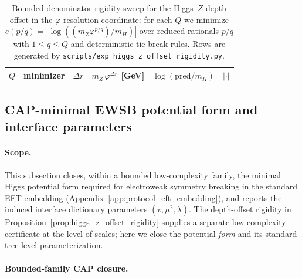 \begin{table}[t]
\centering
\scriptsize
\setlength{\tabcolsep}{6pt}
\renewcommand{\arraystretch}{1.15}
\begin{tabular}{r l r r r r}
\toprule
$Q$ & minimizer & $\Delta r$ & $m_Z\,\varphi^{\Delta r}$ [GeV] & $\log(\mathrm{pred}/m_H)$ & $|\cdot|$ \\
\midrule
%
\end{tabular}
\caption{Bounded-denominator rigidity sweep for the Higgs--$Z$ depth offset in the $\varphi$-resolution coordinate: for each $Q$ we minimize $e(p/q)=|\log((m_Z\varphi^{p/q})/m_H)|$ over reduced rationals $p/q$ with $1\le q\le Q$ and deterministic tie-break rules. Rows are generated by \texttt{scripts/exp\_higgs\_z\_offset\_rigidity.py}.}
\label{tab:higgs_z_offset_sweep}
\end{table}

\subsection{CAP-minimal EWSB potential form and interface parameters}

\paragraph{Scope.}
\AuditTag This subsection closes, within a bounded low-complexity family, the minimal Higgs potential form required for electroweak symmetry breaking in the standard EFT embedding (Appendix~\ref{app:protocol_eft_embedding}), and reports the induced interface dictionary parameters $(v,\mu^2,\lambda)$.
The depth-offset rigidity in Proposition~\ref{prop:higgs_z_offset_rigidity} supplies a separate low-complexity certificate at the level of scales; here we close the potential \emph{form} and its standard tree-level parameterization.

\paragraph{Bounded-family CAP closure.}
%

